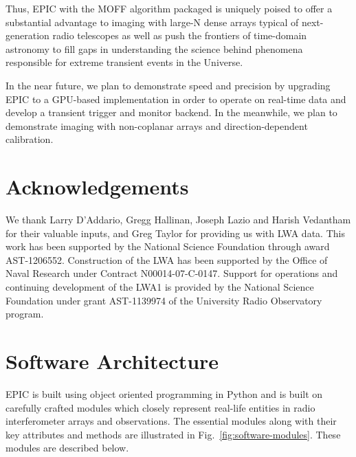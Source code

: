 \documentclass[a4paper,fleqn,usenatbib]{mnras}
\begin{document}
Thus, EPIC with the MOFF algorithm packaged is uniquely poised to offer a
substantial advantage to imaging with large-N dense arrays typical of 
next-generation radio telescopes as well as push the frontiers of 
time-domain astronomy to fill gaps in understanding the science behind 
phenomena responsible for extreme transient events in the Universe.

In the near future, we plan to demonstrate speed and precision by upgrading EPIC to a GPU-based implementation in order to operate on real-time data and develop a transient trigger and monitor backend. In the meanwhile, we plan to demonstrate imaging with non-coplanar arrays and direction-dependent calibration.

\section*{Acknowledgements}

We thank Larry D'Addario, Gregg Hallinan, Joseph Lazio and Harish Vedantham for 
their valuable inputs, and Greg Taylor for providing us with LWA data. This work 
has been supported by the National Science Foundation through award AST-1206552. 
Construction of the LWA has been supported by the Office of Naval Research under 
Contract N00014-07-C-0147. Support for operations and continuing development of 
the LWA1 is provided by the National Science Foundation under grant AST-1139974 
of the University Radio Observatory program.



 
%  
% 


\appendix

\section{Software Architecture}\label{sec:software-modules}

EPIC is built using object oriented programming in Python and is built on
carefully crafted modules which closely represent real-life entities in radio 
interferometer arrays and observations. The essential modules along with their
key attributes and methods are illustrated in Fig.~\ref{fig:software-modules}.
These modules are described below.
\end{document}
